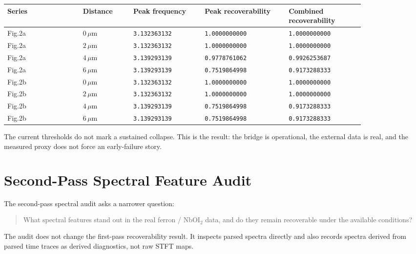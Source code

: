 \documentclass[11pt]{article}
\begin{document}
\begin{longtable}{p{0.18\linewidth}p{0.12\linewidth}p{0.17\linewidth}p{0.20\linewidth}p{0.18\linewidth}}
\toprule
Series & Distance & Peak frequency & Peak recoverability & Combined recoverability \\
\midrule
\endhead
Fig.2a & \(0\,\mu\mathrm{m}\) & \texttt{3.132363132} & \texttt{1.0000000000} & \texttt{1.0000000000} \\
Fig.2a & \(2\,\mu\mathrm{m}\) & \texttt{3.132363132} & \texttt{1.0000000000} & \texttt{1.0000000000} \\
Fig.2a & \(4\,\mu\mathrm{m}\) & \texttt{3.139293139} & \texttt{0.9778761062} & \texttt{0.9926253687} \\
Fig.2a & \(6\,\mu\mathrm{m}\) & \texttt{3.139293139} & \texttt{0.7519864998} & \texttt{0.9173288333} \\
Fig.2b & \(0\,\mu\mathrm{m}\) & \texttt{3.132363132} & \texttt{1.0000000000} & \texttt{1.0000000000} \\
Fig.2b & \(2\,\mu\mathrm{m}\) & \texttt{3.132363132} & \texttt{1.0000000000} & \texttt{1.0000000000} \\
Fig.2b & \(4\,\mu\mathrm{m}\) & \texttt{3.139293139} & \texttt{0.7519864998} & \texttt{0.9173288333} \\
Fig.2b & \(6\,\mu\mathrm{m}\) & \texttt{3.139293139} & \texttt{0.7519864998} & \texttt{0.9173288333} \\
\bottomrule
\end{longtable}

The current thresholds do not mark a sustained collapse. This is the result: the bridge is operational, the external data is real, and the measured proxy does not force an early-failure story.

\section{Second-Pass Spectral Feature Audit}

The second-pass spectral audit asks a narrower question:

\begin{quote}
What spectral features stand out in the real ferron / NbOI$_2$ data, and do they remain recoverable under the available conditions?
\end{quote}

The audit does not change the first-pass recoverability result. It inspects parsed spectra directly and also records spectra derived from parsed time traces as derived diagnostics, not raw STFT maps.
\end{document}
